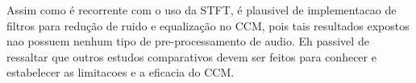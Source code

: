 \documentclass{article}
\begin{document}
	Assim como é recorrente com o uso da STFT, é plausivel de implementacao de filtros para redução de ruido e equalização no CCM, pois tais resultados expostos nao possuem nenhum tipo de pre-processamento de audio. Eh passivel de ressaltar que outros estudos comparativos devem ser feitos para conhecer e estabelecer as limitacoes e a eficacia do CCM.






%
%
%
%
\end{document}
